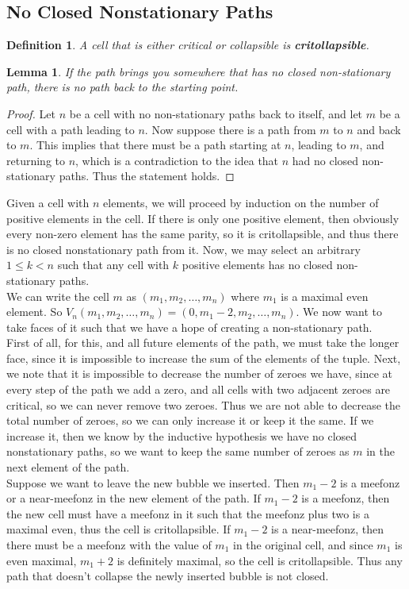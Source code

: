 \documentclass{amsart}
\newtheorem{Definition}[theorem]{Definition}
\newtheorem{lemma}[theorem]{Lemma}
\newenvironment{definition}{\begin{Definition}\normalfont}{\end{Definition}}
\begin{document}
\subsection{No Closed Nonstationary Paths}
\begin{definition}\label{critColl} A cell that is either critical or collapsible is \textbf{critollapsible}.\end{definition}
\begin{lemma}\label{nonStationary}If the path brings you somewhere that has no closed non-stationary path, there is no path back to the starting point.\end{lemma}
\begin{proof}Let $n$ be a cell with no non-stationary paths back to itself, and let $m$ be a cell with a path leading to $n$. Now suppose there is a path from $m$ to $n$ and back to $m$. This implies that there must be a path starting at $n$, leading to $m$, and returning to $n$, which is a contradiction to the idea that $n$ had no closed non-stationary paths. Thus the statement holds.\end{proof}
Given a cell with $n$ elements, we will proceed by induction on the number of positive elements in the cell. If there is only one positive element, then obviously every non-zero element has the same parity, so it is critollapsible, and thus there is no closed nonstationary path from it. Now, we may select an arbitrary $1 \leq k < n$ such that any cell with $k$ positive elements has no closed non-stationary paths. \\
We can write the cell $m$ as $(m_1,m_2,\ldots,m_n)$ where $m_1$ is a maximal even element. So $V_n(m_1,m_2,\ldots,m_n)=(0,m_1-2,m_2,\ldots,m_n)$. We now want to take faces of it such that we have a hope of creating a non-stationary path. \\
First of all, for this, and all future elements of the path, we must take the longer face, since it is impossible to increase the sum of the elements of the tuple. Next, we note that it is impossible to decrease the number of zeroes we have, since at every step of the path we add a zero, and all cells with two adjacent zeroes are critical, so we can never remove two zeroes. Thus we are not able to decrease the total number of zeroes, so we can only increase it or keep it the same. If we increase it, then we know by the inductive hypothesis we have no closed nonstationary paths, so we want to keep the same number of zeroes as $m$ in the next element of the path. \\
Suppose we want to leave the new bubble we inserted. Then $m_1-2$ is a meefonz or a near-meefonz in the new element of the path. If $m_1-2$ is a meefonz, then the new cell must have a meefonz in it such that the meefonz plus two is a maximal even, thus the cell is critollapsible. If $m_1-2$ is a near-meefonz, then there must be a meefonz with the value of $m_1$ in the original cell, and since $m_1$ is even maximal, $m_1+2$ is definitely maximal, so the cell is critollapsible. Thus any path that doesn't collapse the newly inserted bubble is not closed. \\
\end{document}
